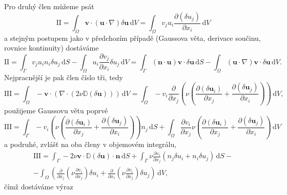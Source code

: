 Pro druhý člen můžeme psát
\begin{equation}
\mathrm{II}
=
\int_{\Omega} 
\mathbf{v}\cdot(\mathbf{u}\cdot \nabla)\delta\mathbf{u}
\, \mathrm{d}V
=
\int_{\Omega} 
v_j  u_i \frac{\partial (\delta u_j)}{\partial x_i}
\, \mathrm{d}V
\end{equation}
a stejným postupem jako v předchozím případě (Gaussova věta, derivace součinu, rovnice kontinuity) dostáváme
\begin{equation}\label{eq:clen_II}
\mathrm{II}
=
\int_{\Gamma} 
v_j u_i n_i \delta u_j  
\, \mathrm{d}S
-
\int_{\Omega} 
u_i \frac{\partial v_j  }{\partial x_i} \delta u_j
\, \mathrm{d}V
=
\int_{\Gamma} 
(\mathbf{n} \cdot \mathbf{u}) \mathbf{v}\cdot \delta \mathbf{u} 
\, \mathrm{d}S
-
\int_{\Omega} 
(\mathbf{u} \cdot \nabla)\mathbf{v}\cdot \delta \mathbf{u}
\, \mathrm{d}V.
\end{equation}
Nejpracnější je pak člen číslo tři, tedy
\begin{equation*}
\mathrm{III}
=
\int_{\Omega} 
-\mathbf{v}\cdot \left(\nabla \cdot (2\nu \mathbb{D}(\delta \mathbf{u}) )\right)
\, \mathrm{d}V
=
\int_{\Omega} 
- v_i \frac{\partial}{\partial x_j} \left(  \nu
\left(\frac{\partial (\delta \mathbf{u}_i)}{\partial x_j} + 
\frac{\partial (\delta \mathbf{u}_j)}{\partial x_i}\right)
\right)
\, \mathrm{d}V,
\end{equation*}
použijeme Gaussovu větu poprvé
\begin{equation*}
\mathrm{III}
=
\int_{\Gamma} 
- v_i \left(  \nu
\left(\frac{\partial (\delta \mathbf{u}_i)}{\partial x_j} + 
\frac{\partial (\delta \mathbf{u}_j)}{\partial x_i}\right)
\right) n_j
\, \mathrm{d}S
+
\int_{\Omega} 
\frac{\partial v_i}{\partial x_j}   \nu
\left(\frac{\partial (\delta \mathbf{u}_i)}{\partial x_j} + 
\frac{\partial (\delta \mathbf{u}_j)}{\partial x_i}\right)
\, \mathrm{d}V
\end{equation*}
a podruhé, zvlášť na oba členy v objemovém integrálu,
\begin{multline*}
\mathrm{III}
=
\int_{\Gamma} 
- 2\nu \mathbf{v} \cdot  \mathbb{D}(\delta \mathbf{u})\cdot \mathbf{n}
\, \mathrm{d}S
+
\int_{\Gamma} 
\nu \frac{\partial v_i}{\partial x_j}
(n_j \delta u_i + n_i \delta u_j)
\, \mathrm{d}S
-\\-
\int_{\Omega} 
\left(\frac{\partial}{\partial x_j}\left( \nu \frac{\partial v_i}{\partial x_j} \right) \delta u_i + \frac{\partial}{\partial x_i}\left( \nu \frac{\partial v_i}{\partial x_j} \right) \delta u_j\right)
\, \mathrm{d}V,
\end{multline*}
čímž dostáváme výraz
